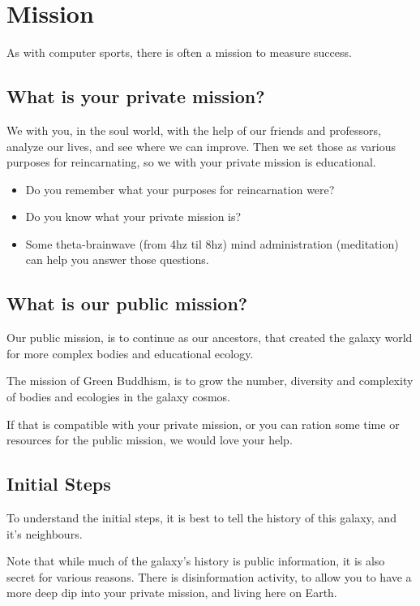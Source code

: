 \documentclass{report}
\begin{document}
\section{Mission}
\label{mission}

As with computer sports, there is often a mission to measure success.

\subsection{What is your private mission?}

We with you, in the soul world, with the help of our friends and professors,
 analyze our lives, and see where we can improve. Then we set those as various
purposes for reincarnating, so we with your private mission is educational.

\begin{itemize}
\item Do you remember what your purposes for reincarnation were?
\item Do you know what your private mission is?
\item Some theta-brainwave (from 4hz til 8hz) mind administration (meditation) can help you answer those
questions. 
\end{itemize}

\subsection{What is our public mission?}

Our public mission, is to continue as our ancestors, that created the galaxy
world for more complex bodies and educational ecology.  


The mission of Green Buddhism, is to grow the number, diversity and complexity of bodies and
ecologies in the galaxy cosmos. 

If that is compatible with your private mission, or you can ration some time or
resources for
the public mission, we would love your help.

\subsection{Initial Steps}

To understand the initial steps, it is best to tell the history of this galaxy,
and it's neighbours.

Note that while much of the galaxy's history is public information, it is also
secret for various reasons. There is disinformation activity, to allow you to
have a more deep dip into your private mission, and living here on Earth.
\end{document}
